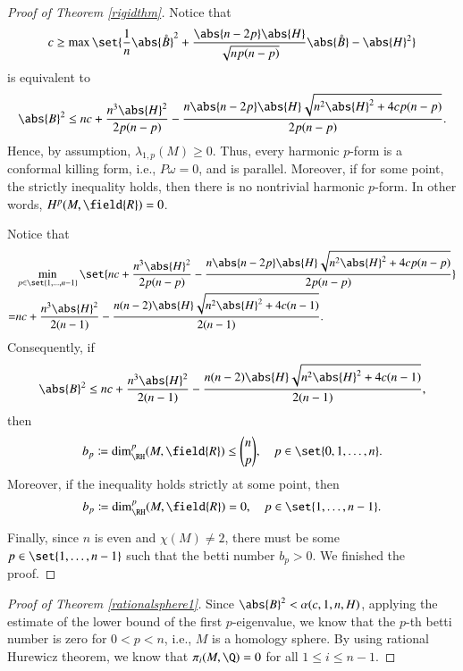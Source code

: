 \documentclass[12pt]{amsart}
\theoremstyle{plain}
\theoremstyle{remark}
\theoremstyle{definition}
\numberwithin{equation}{section}
\begin{document}
\begin{proof}[Proof of Theorem \ref{rigidthm}]
Notice that
\begin{align*}
c\geq\max\set{\dfrac{1}{n}\abs{\mathring{B}}^2+\dfrac{\abs{n-2p}\abs{H}}{\sqrt{np(n-p)}}\abs{\mathring{B}}-\abs{H}^2}
\end{align*}
is equivalent to
\begin{align*}
\abs{B}^2\leq nc+\dfrac{n^3\abs{H}^2}{2p(n-p)}-\dfrac{n\abs{n-2p}\abs{H}\sqrt{n^2\abs{H}^2+4cp(n-p)}}{2p(n-p)}.
\end{align*}
Hence, by assumption,  $\lambda_{1,p}(M)\geq0$. Thus, every harmonic $p$-form is a conformal killing form, i.e., $P\omega=0$, and is parallel. Moreover, if for some point, the strictly inequality holds, then there is no nontrivial harmonic $p$-form. In other words, $H^p(M,{\field{R}})=0$.

Notice that
\begin{align*}
&\min_{p\in\set{1,\dotsc,n-1}}\set{nc+\dfrac{n^3\abs{H}^2}{2p(n-p)}-\dfrac{n\abs{n-2p}\abs{H}\sqrt{n^2\abs{H}^2+4cp(n-p)}}{2p(n-p)}}\\
=&nc+\dfrac{n^3\abs{H}^2}{2(n-1)}-\dfrac{n(n-2)\abs{H}\sqrt{n^2\abs{H}^2+4c(n-1)}}{2(n-1)}.
\end{align*}
Consequently, if
\begin{align*}
\abs{B}^2\leq nc+\dfrac{n^3\abs{H}^2}{2(n-1)}-\dfrac{n(n-2)\abs{H}\sqrt{n^2\abs{H}^2+4c(n-1)}}{2(n-1)},
\end{align*}
then
\begin{align*}
b_p\coloneqq\dim_\RH^p(M,{\field{R}})\leq\binom{n}{p},\quad p\in\set{0,1,\dotsc, n}.
\end{align*}
Moreover, if the inequality holds strictly at some point, then
\begin{align*}
b_p\coloneqq\dim_\RH^p(M,{\field{R}})=0,\quad p\in\set{1,\dotsc, n-1}.
\end{align*}

Finally, since $n$ is even and $\chi(M)\neq 2$, there must be some $p\in\set{1,\dotsc, n-1}$ such that the betti number $b_p>0$. We finished the proof.
\end{proof}

\begin{proof}[Proof of Theorem \ref{rationalsphere1}]Since $\abs{B}^2<\alpha(c,1,n,H)$, applying the estimate of the lower bound of the first $p$-eigenvalue, we know that the $p$-th betti number is zero for $0<p<n$, i.e., $M$ is a homology sphere.  By using rational Hurewicz theorem, we know that $\pi_i(M,\Q)=0$ for all $1\leq i\leq n-1$.
\end{proof}
\end{document}
